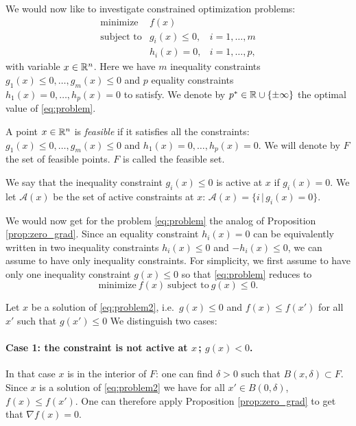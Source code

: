 \documentclass[11pt,nocut]{article}
\begin{document}
We would now like to investigate constrained optimization problems:
\begin{equation}\label{eq:problem}
	\begin{array}{lll}
		\text{minimize} & f(x) & \\
		\text{subject to} & g_i(x) \leq 0, & i=1, \dots, m \\
						  & h_i(x) = 0, & i=1, \dots, p,
	\end{array}
\end{equation}
with variable $x \in \mathbb{R}^n$.
Here we have $m$ inequality constraints $g_1(x) \leq 0, \dots, g_m(x)\leq  0$ and $p$ equality constraints $h_1(x) = 0, \dots, h_p(x) = 0$ to satisfy.
We denote by $p^* \in \mathbb{R} \cup \{\pm \infty\}$ the optimal value of \eqref{eq:problem}.

\begin{definition}
	A point $x \in \mathbb{R}^n$ is \emph{feasible} if it satisfies all the constraints: $g_1(x) \leq 0, \dots, g_m(x)\leq  0$ and $h_1(x) = 0, \dots, h_p(x) = 0$. We will denote by $F$ the set of feasible points. $F$ is called the feasible set.
\end{definition}

\begin{definition}
	We say that the inequality constraint $g_i(x) \leq 0$ is active at $x$ if $g_i(x) = 0$.
	We let $\mathcal{A}(x)$ be the set of active constraints at $x$: $\mathcal{A}(x) = \{ i \, | \, g_i(x) = 0\}$.
\end{definition}
We would now get for the problem \eqref{eq:problem} the analog of Proposition \ref{prop:zero_grad}.
Since an equality constraint $h_i(x) = 0$ can be equivalently written in two inequality constraints $h_i(x) \leq 0$ and $-h_i(x) \leq 0$, we can assume to have only inequality constraints.
For simplicity, we first assume to have only one inequality constraint $g(x) \leq 0$ so that \eqref{eq:problem} reduces to
\begin{equation}\label{eq:problem2}
	\text{minimize} \ f(x) \ \text{subject to} \ g(x) \leq 0.
\end{equation}


Let $x$ be a solution of \eqref{eq:problem2}, i.e.\ $g(x) \leq 0$ and $f(x) \leq f(x')$ for all $x'$ such that $g(x')\leq0$
We distinguish two cases:

\paragraph{Case 1: the constraint is not active at $x\,$; $g(x) <0$.} In that case $x$ is in the interior of $F$: one can find $\delta > 0$ such that $B(x,\delta) \subset F$. Since $x$ is a solution of \eqref{eq:problem2} we have for all $x' \in B(0,\delta)$, $f(x) \leq f(x')$. One can therefore apply Proposition \ref{prop:zero_grad} to get that $\nabla f(x) = 0$.
\end{document}
